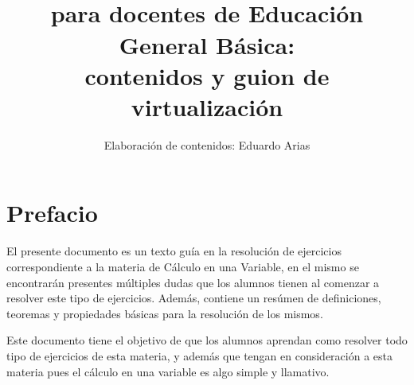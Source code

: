 \documentclass[11pt]{report}
\begin{document}
\nocite{*}

\title{ \\
	para docentes de Educaci\'on General B\'asica: \\
	contenidos y guion de virtualizaci\'on}

\author{Elaboraci\'on de contenidos: Eduardo Arias}

\date{}


\chapter*{Prefacio}

El presente documento es un texto gu\'ia en la resoluci\'on de ejercicios correspondiente a la materia de C\'alculo en una Variable, en el mismo se encontrar\'an presentes m\'ultiples dudas que los alumnos tienen al comenzar a resolver este tipo de ejercicios. Adem\'as, contiene un res\'umen de definiciones, teoremas y propiedades b\'asicas para la resoluci\'on de los mismos.\newline

Este documento tiene el objetivo de que los alumnos aprendan como resolver todo tipo de ejercicios de esta materia, y adem\'as que tengan en consideraci\'on a esta materia pues el c\'alculo en una variable es algo simple y llamativo.
  \cleartooddpage[\thispagestyle{empty}]


  \cleartooddpage[\thispagestyle{empty}]





\end{document}
